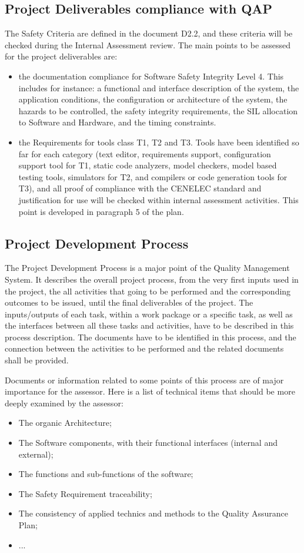 \documentclass{template/openetcs_article}
\begin{document}
\subsection{Project Deliverables compliance with QAP}
The Safety Criteria are defined in the document D2.2, and these criteria will be checked during the Internal Assessment review. The main points to be assessed for the project deliverables are:
\begin{itemize}
\item the documentation compliance for Software Safety Integrity Level 4. This includes for instance: a functional and interface description of the system, the application conditions, the configuration or architecture of the system, the hazards to be controlled, the safety integrity requirements, the SIL allocation to Software and Hardware, and the timing constraints.
\item the Requirements for tools class T1, T2 and T3. Tools have been identified so far for each category (text editor, requirements support, configuration support tool for T1,  static code analyzers, model checkers, model based testing tools, simulators for T2, and compilers or code generation tools for T3), and all proof of compliance with the CENELEC standard and justification for use will be checked within internal assessment activities. This point is developed in paragraph 5 of the plan.
\end{itemize}

\subsection{Project Development Process}
The Project Development Process is a major point of the Quality Management System. It describes the overall project process, from the very first inputs used in the project, the all activities that going to be performed and the corresponding outcomes to be issued, until the final deliverables of the project. The inputs/outputs of each task, within a work package or a specific task, as well as the interfaces between all these tasks and activities, have to be described in this process description.
The documents have to be identified in this process, and the connection  between the activities to be performed and the related documents shall be provided.

Documents or information related to some points of this process are of major importance for the assessor. Here is a list of technical items that should be more deeply examined by the assessor:
\begin{itemize}
\item The organic Architecture;
\item The Software components, with their functional interfaces (internal and external);
\item The functions and sub-functions of the software;
\item The Safety Requirement traceability;
\item The consistency of applied technics and methods to the Quality Assurance Plan;
\item ...
\end{itemize}
\end{document}
